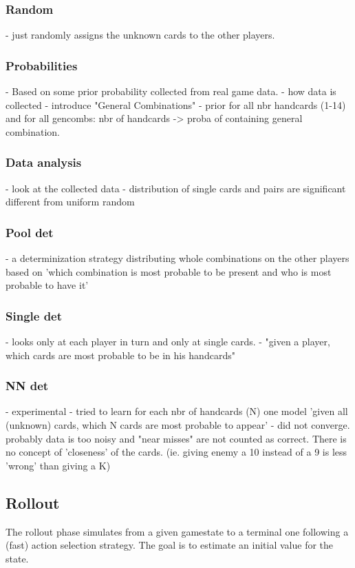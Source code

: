 \subsubsection{Random}
- just randomly assigns the unknown cards to the other players.


\subsubsection{Probabilities}
- Based on some prior probability collected from real game data. - how data is collected
- introduce "General Combinations"
- prior for all nbr handcards (1-14) and for all gencombs: nbr of handcards -> proba of containing general combination.


\subsubsection{Data analysis}
- look at the collected data
- distribution of single cards and pairs are significant different from uniform random


\subsubsection{Pool det}
- a determinization strategy distributing whole combinations on the other players based on 'which combination is most probable to be present and who is most probable to have it'


\subsubsection{Single det}
- looks only at each player in turn and only at single cards.
- "given a player, which cards are most probable to be in his handcards"

\subsubsection{NN det}
- experimental
- tried to learn for each nbr of handcards (N) one model 'given all (unknown) cards, which N cards are most probable to appear'
- did not converge. probably data is too noisy and "near misses" are not counted as correct. There is no concept of 'closeness' of the cards. (ie. giving enemy a 10 instead of a 9 is less 'wrong' than giving a K)



\subsection{Rollout}
\label{sec:rollout}
The rollout phase simulates from a given gamestate to a terminal one following a (fast) action selection strategy. The goal is to estimate an initial value for the state.

